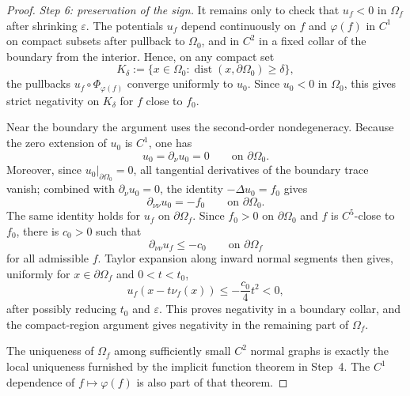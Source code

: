 \begin{proof}
\medskip
\noindent\emph{Step 6: preservation of the sign.}
It remains only to check that \(u_f<0\) in \(\Omega_f\) after shrinking
\(\varepsilon\). The potentials \(u_f\) depend continuously on \(f\) and
\(\varphi(f)\) in \(C^1\) on compact subsets after pullback to \(\Omega_0\),
and in \(C^2\) in a fixed collar of the boundary from the interior. Hence, on
any compact set
\[
K_\delta:=\{x\in\Omega_0:\operatorname{dist}(x,\partial\Omega_0)\ge\delta\},
\]
the pullbacks \(u_f\circ\Phi_{\varphi(f)}\) converge uniformly to \(u_0\).
Since \(u_0<0\) in \(\Omega_0\), this gives strict negativity on \(K_\delta\)
for \(f\) close to \(f_0\).

Near the boundary the argument uses the second-order nondegeneracy. Because
the zero extension of \(u_0\) is \(C^1\), one has
\[
u_0=\partial_\nu u_0=0
\qquad\text{on }\partial\Omega_0 .
\]
Moreover, since \(u_0|_{\partial\Omega_0}=0\), all tangential derivatives of
the boundary trace vanish; combined with \(\partial_\nu u_0=0\), the identity
\(-\Delta u_0=f_0\) gives
\[
\partial_{\nu\nu}u_0=-f_0
\qquad\text{on }\partial\Omega_0 .
\]
The same identity holds for \(u_f\) on \(\partial\Omega_f\). Since
\(f_0>0\) on \(\partial\Omega_0\) and \(f\) is \(C^5\)-close to \(f_0\), there
is \(c_0>0\) such that
\[
\partial_{\nu\nu}u_f\le -c_0
\qquad\text{on }\partial\Omega_f
\]
for all admissible \(f\). Taylor expansion along inward normal segments then
gives, uniformly for \(x\in\partial\Omega_f\) and \(0<t<t_0\),
\[
u_f(x-t\nu_f(x))\le -\frac{c_0}{4}t^2<0,
\]
after possibly reducing \(t_0\) and \(\varepsilon\). This proves negativity in
a boundary collar, and the compact-region argument gives negativity in the
remaining part of \(\Omega_f\).

The uniqueness of \(\Omega_f\) among sufficiently small \(C^2\) normal graphs
is exactly the local uniqueness furnished by the implicit function theorem in
Step~4. The \(C^1\) dependence of \(f\mapsto\varphi(f)\) is also part of that
theorem.
\end{proof}
